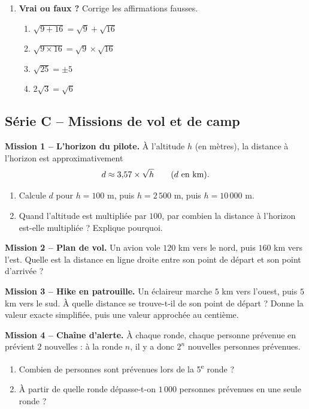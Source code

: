 \documentclass[../main.tex]{subfiles}
\begin{document}
\begin{enumerate}[label=\textbf{\arabic*.},start=6]
\item \textbf{Vrai ou faux ?} Corrige les affirmations fausses.
\begin{enumerate}[label=\alph*)]
  \item $\sqrt{9+16} = \sqrt{9}+\sqrt{16}$ \qquad
  \item $\sqrt{9\times16} = \sqrt{9}\times\sqrt{16}$ \qquad
  \item $\sqrt{25} = \pm 5$ \qquad
  \item $2\sqrt{3} = \sqrt{6}$
\end{enumerate}

\end{enumerate}

\subsection{Série C -- Missions de vol et de camp}

\textbf{Mission 1 -- L'horizon du pilote.}
À l'altitude $h$ (en mètres), la distance à l'horizon est approximativement
\[
d \approx 3{,} 57 \times \sqrt{h} \qquad (d \text{ en km}).
\]
\begin{enumerate}[label=\alph*)]
  \item Calcule $d$ pour $h = 100$ m, puis $h = 2\,500$ m, puis $h = 10\,000$ m.
  \item Quand l'altitude est multipliée par $100$, par combien la distance à l'horizon est-elle multipliée ? Explique pourquoi.
\end{enumerate}

\textbf{Mission 2 -- Plan de vol.}
Un avion vole $120$ km vers le nord, puis $160$ km vers l'est. Quelle est la distance en ligne droite entre son point de départ et son point d'arrivée ?

\textbf{Mission 3 -- Hike en patrouille.}
Un éclaireur marche $5$ km vers l'ouest, puis $5$ km vers le sud. À quelle distance se trouve-t-il de son point de départ ? Donne la valeur exacte simplifiée, puis une valeur approchée au centième.

\textbf{Mission 4 -- Chaîne d'alerte.}
À chaque ronde, chaque personne prévenue en prévient $2$ nouvelles : à la ronde $n$, il y a donc $2^n$ nouvelles personnes prévenues.
\begin{enumerate}[label=\alph*)]
  \item Combien de personnes sont prévenues lors de la 5\textsuperscript{e} ronde ?
  \item À partir de quelle ronde dépasse-t-on $1\,000$ personnes prévenues en une seule ronde ?
\end{enumerate}
\end{document}

